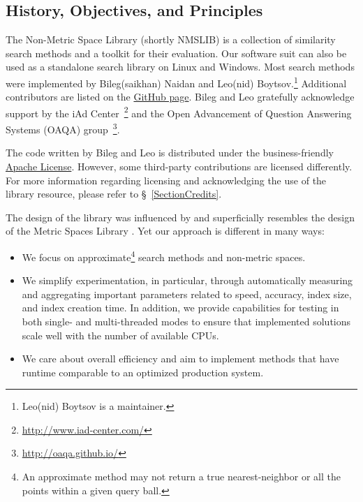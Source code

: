 \documentclass[runningheads,a4paper]{llncs}
\begin{document}
{\subsection{History, Objectives, and Principles}
The Non-Metric Space Library (shortly NMSLIB) is a collection of
similarity search methods and a toolkit for their evaluation.
Our software suit can also be used as a standalone search library on Linux and Windows. 
Most search methods were implemented by Bileg(saikhan) Naidan and Leo(nid) Boytsov.\footnote{Leo(nid) Boytsov is a maintainer.}
Additional contributors are listed on the \href{https://github.com/searchivarius/NonMetricSpaceLib}{GitHub 
page}.
Bileg and Leo gratefully acknowledge support by the iAd Center~\footnote{\url{http://www.iad-center.com/}}
and the Open Advancement of Question Answering Systems (OAQA) group~\footnote{\url{http://oaqa.github.io/}}.


The code written by Bileg and Leo is distributed under the business-friendly \href{http://apache.org/licenses/LICENSE-2.0}{Apache License}. 
However, some third-party contributions are licensed differently.
For more information regarding licensing and acknowledging the use of the library
resource, please refer to \S~\ref{SectionCredits}.

The design of the library was influenced by 
and superficially resembles the design of the Metric Spaces Library \cite{LibMetricSpace}.
Yet our approach is different in many ways:

\begin{itemize}
\item We focus on approximate\footnote{
An approximate method may not
return a true nearest-neighbor or
 all the points within a given query ball.}
  search methods and non-metric spaces.

\item We simplify experimentation, in particular, 
through automatically measuring and aggregating important parameters
related to speed, accuracy, index size, and index creation time. 
In addition, we provide capabilities for testing in both single- and multi-threaded modes
to ensure that implemented solutions scale well with the number of available CPUs.

\item We care about overall efficiency and
aim to implement methods that have runtime comparable to an optimized production system. 
\end{itemize}

}
\end{document}
